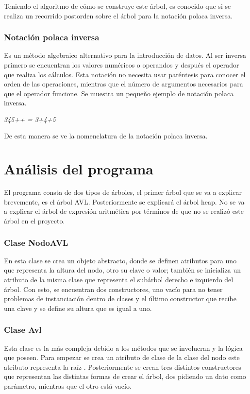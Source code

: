 \documentclass[12pt]{article}
\begin{document}
Teniendo el algoritmo de cómo se construye este árbol, es conocido que si se realiza un recorrido postorden sobre el árbol para la notación polaca inversa.

\subsubsection{Notación polaca inversa}

Es un método algebraico alternativo para la introducción de datos. Al ser inversa primero se encuentran los valores numéricos o operandos  y después el operador que realiza los cálculos. Esta notación no necesita usar paréntesis para conocer el orden de las operaciones, mientras que  el número de argumentos necesarios para que el operador funcione. Se muestra un pequeño ejemplo de notación polaca inversa.

\begin{center}
    \textit{345++ = 3+4+5}
\end{center}

De esta manera se ve la nomenclatura de la notación polaca inversa.

\section{Análisis del programa}
El programa consta de dos tipos de árboles, el primer árbol que se va a explicar brevemente, es el árbol AVL. Posteriormente se explicará el árbol heap. No se va a explicar el árbol de expresión aritmética por términos de que no se realizó este árbol en el proyecto.

\subsubsection{Clase NodoAVL}
En esta clase se crea un objeto abstracto, donde se definen atributos para uno que representa la altura del nodo, otro su clave o valor; también se inicializa un atributo de la misma clase que representa el subárbol derecho e izquierdo del árbol. Con esto, se encuentran dos constructores, uno vacío para no tener problemas de instanciación dentro de clases y el último constructor que recibe  una clave y se define su altura que es igual a uno.

\subsubsection{Clase Avl}
Esta clase es la más compleja debido a los métodos que se involucran y la lógica que poseen. Para empezar se crea un atributo de clase de la clase del nodo este atributo representa la raíz . Posteriormente se crean tres distintos constructores que representan las distintas formas de crear el árbol, dos pidiendo un dato como parámetro, mientras que el otro está vacío. 
\end{document}
